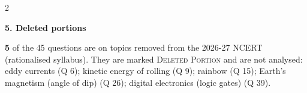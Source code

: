 \begin{multicols}{2}
{\begin{itemize}[leftmargin=1em,nosep]
\end{itemize}}\par\medskip
\textbf{\color{crimson}5. Deleted portions}\par\smallskip
\textbf{5} of the 45 questions are on topics removed from the 2026-27 NCERT (rationalised syllabus). They are marked \textsc{Deleted Portion} and are not analysed: eddy currents (Q 6); kinetic energy of rolling (Q 9); rainbow (Q 15); Earth's magnetism (angle of dip) (Q 26); digital electronics (logic gates) (Q 39).\par
\end{multicols}


